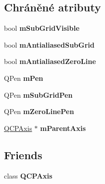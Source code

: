 \subsection*{Chráněné atributy}
\begin{DoxyCompactItemize}
\item 
\hypertarget{classQCPGrid_a4e4a0400d6319bb44c06341f6298c87b}{}bool {\bfseries m\+Sub\+Grid\+Visible}\label{classQCPGrid_a4e4a0400d6319bb44c06341f6298c87b}

\item 
\hypertarget{classQCPGrid_a71b7051f833f0c5de3094998d6afdd87}{}bool {\bfseries m\+Antialiased\+Sub\+Grid}\label{classQCPGrid_a71b7051f833f0c5de3094998d6afdd87}

\item 
\hypertarget{classQCPGrid_a8c0df56ae86440408c050895dcdb922b}{}bool {\bfseries m\+Antialiased\+Zero\+Line}\label{classQCPGrid_a8c0df56ae86440408c050895dcdb922b}

\item 
\hypertarget{classQCPGrid_a1cdc4a3bccf6a40c2d4360def9fefa40}{}Q\+Pen {\bfseries m\+Pen}\label{classQCPGrid_a1cdc4a3bccf6a40c2d4360def9fefa40}

\item 
\hypertarget{classQCPGrid_aa9004bc139ad3ea92629f0aaae81d83f}{}Q\+Pen {\bfseries m\+Sub\+Grid\+Pen}\label{classQCPGrid_aa9004bc139ad3ea92629f0aaae81d83f}

\item 
\hypertarget{classQCPGrid_a379481871f17655c27eda30af233554f}{}Q\+Pen {\bfseries m\+Zero\+Line\+Pen}\label{classQCPGrid_a379481871f17655c27eda30af233554f}

\item 
\hypertarget{classQCPGrid_a9a8a76731e6e737b65b929fd1995cc88}{}\hyperlink{classQCPAxis}{Q\+C\+P\+Axis} $\ast$ {\bfseries m\+Parent\+Axis}\label{classQCPGrid_a9a8a76731e6e737b65b929fd1995cc88}

\end{DoxyCompactItemize}
\subsection*{Friends}
\begin{DoxyCompactItemize}
\item 
\hypertarget{classQCPGrid_af123edeca169ec7a31958a1d714e1a8a}{}class {\bfseries Q\+C\+P\+Axis}\label{classQCPGrid_af123edeca169ec7a31958a1d714e1a8a}

\end{DoxyCompactItemize}

